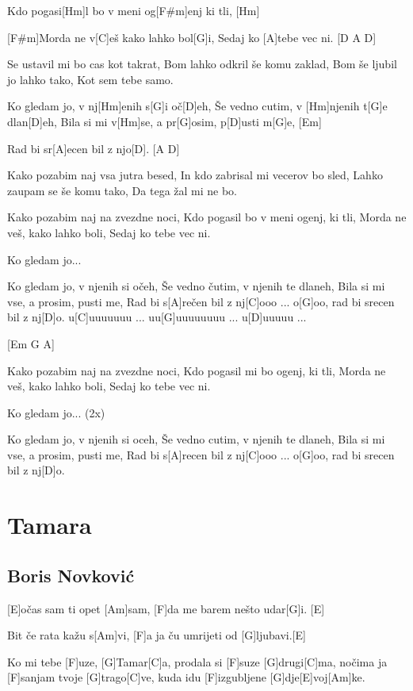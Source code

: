 \documentclass[a4paper,12pt]{article}
\begin{document}
\begin{multicols}{2}
\begin{guitar}
[A]Kdo pogasi[Hm]l bo v meni og[F#m]enj  ki  tli, [Hm]

[F#m]Morda ne v[C]eš kako lahko bol[G]i,
Sedaj ko [A]tebe vec ni. [D A D]


Se ustavil mi bo cas kot takrat,
Bom lahko odkril še komu zaklad,
Bom še ljubil jo lahko tako,
Kot sem tebe samo.


Ko gledam jo, v nj[Hm]enih s[G]i oč[D]eh,
Še vedno cutim, v [Hm]njenih t[G]e  dlan[D]eh,
Bila si mi v[Hm]se, a pr[G]osim, p[D]usti  m[G]e, [Em]

Rad bi sr[A]ecen bil z njo[D]. [A D]

     
Kako pozabim naj vsa jutra besed,
In kdo zabrisal mi vecerov bo sled,
Lahko zaupam se še komu tako,
Da tega žal mi ne bo.


Kako pozabim naj na zvezdne noci,
Kdo pogasil bo v meni ogenj, ki tli,
Morda ne veš, kako lahko boli,
Sedaj ko tebe vec ni.


Ko gledam jo...

                
Ko gledam jo, v njenih si očeh,
Še vedno čutim, v njenih te dlaneh,
Bila si mi vse, a prosim, pusti me,
Rad bi s[A]rečen bil z nj[C]ooo     ...  o[G]oo, 
rad bi srecen bil z nj[D]o.
u[C]uuuuuuu ... uu[G]uuuuuuuu ... u[D]uuuuu ...


[Em  G  A]           

Kako pozabim naj na zvezdne noci,
Kdo pogasil mi bo ogenj, ki tli,
Morda ne veš, kako lahko boli,
Sedaj ko tebe vec ni.


Ko gledam jo... (2x)


Ko gledam jo, v njenih si oceh,
Še vedno cutim, v njenih te dlaneh,
Bila si mi vse, a prosim, pusti me,
Rad bi s[A]recen bil z nj[C]ooo  ...  o[G]oo, 
rad bi srecen bil z nj[D]o.


\end{guitar}
\section{Tamara}
\subsection*{Boris Novković}
\begin{guitar}

[E]očas sam ti opet [Am]sam, 
[F]da me barem nešto udar[G]i. [E]

Bit če rata kažu s[Am]vi, 
[F]a ja ču umrijeti od [G]ljubavi.[E] 



Ko mi tebe [F]uze, [G]Tamar[C]a, 
prodala si [F]suze [G]drugi[C]ma, 
nočima ja [F]sanjam tvoje [G]trago[C]ve, 
kuda idu [F]izgubljene [G]dje[E]voj[Am]ke. 


\end{guitar}
\end{multicols}
\end{document}
